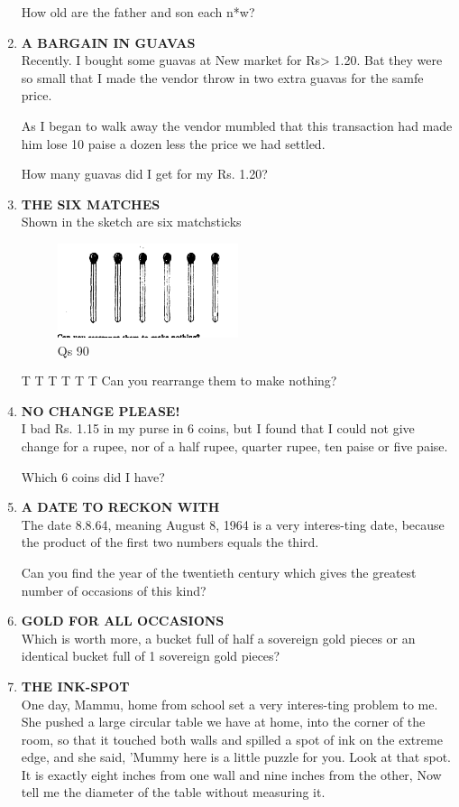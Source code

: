 \documentclass[12pt]{article}
\begin{document}
\begin{enumerate}
How  old are the father  and son each  n*w? 
%
\item \textbf{A  BARGAIN  IN GUAVAS} \\
Recently.  I bought  some  guavas  at New  market  for Rs> 1.20.  Bat  they  were  so small  that  I made  the vendor throw  in two extra  guavas  for the samfe  price. 

As I began  to walk  away  the vendor  mumbled  that this transaction  had made  him lose  10 paise  a dozen  less the price  we had settled. 

How  many  guavas  did I get for my Rs. 1.20? 
%
\item \textbf{THE  SIX  MATCHES} \\
Shown  in the sketch  are six matchsticks 

\begin{figure}[h]
\begin{center}
\includegraphics[width=0.5\textwidth]{sdevi_q90.png}
\caption{ Qs 90}
\end{center}
\end{figure}

T T T T T T
Can you  rearrange  them  to make  nothing? 
%
\item \textbf{NO CHANGE  PLEASE!} \\
I bad Rs. 1.15  in my purse  in 6 coins,  but I found  that  I could  not  give  change  for a rupee,  nor of a half  rupee, quarter  rupee,  ten paise  or five paise. 

Which  6 coins  did I have? 
%
\item \textbf{A  DATE  TO RECKON  WITH} \\
The date  8.8.64,  meaning  August  8, 1964  is a very  interes-ting date,  because  the  product  of the first  two numbers equals  the third. 

Can you find  the year  of the twentieth  century  which gives  the greatest  number  of occasions  of this kind? 
%
\item \textbf{GOLD  FOR  ALL  OCCASIONS} \\ 
Which is worth  more,  a bucket  full of half  a sovereign gold pieces  or an identical  bucket  full of 1 sovereign  gold pieces? 
%
\item \textbf{THE  INK-SPOT} \\
One day,  Mammu,  home  from  school  set a very  interes-ting problem  to me.  She  pushed  a large  circular  table we have  at home,  into  the corner  of the room,  so that  it touched  both  walls  and  spilled  a spot  of ink  on the extreme  edge,  and she said,  'Mummy  here  is a little  puzzle for you.  Look  at that  spot.  It is exactly  eight  inches from  one wall  and nine  inches  from  the other,  Now  tell me the diameter  of the table  without  measuring  it.


\end{enumerate}
\end{document}
